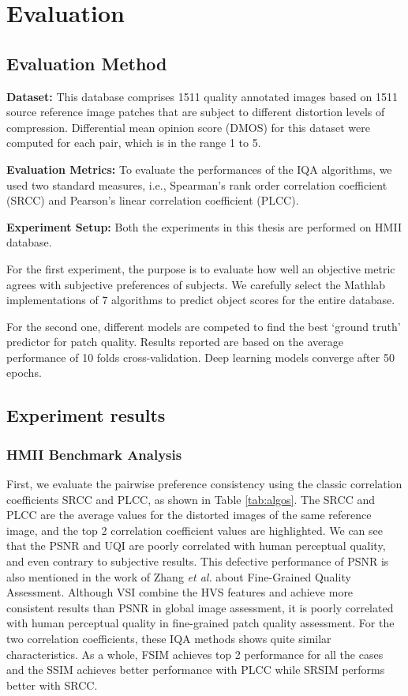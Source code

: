 \chapter{Evaluation}

\section{Evaluation Method} 

 
\textbf{Dataset:} 
This database comprises 1511 quality annotated images based on 1511 source reference image patches that are subject to different distortion levels of compression. 
Differential mean opinion score (DMOS) for this dataset were computed for each pair, which is in the range 1 to 5.

\textbf{Evaluation Metrics:}
To evaluate the performances of the IQA algorithms, we used two standard measures, i.e., Spearman's rank order correlation coefficient (SRCC) and Pearson's linear correlation coefficient (PLCC).

\textbf{Experiment Setup:}
Both the experiments in this thesis are performed on HMII database.

For the first experiment, the purpose is to evaluate how well an objective metric agrees with subjective preferences of subjects. We carefully select the Mathlab implementations of 7 algorithms to predict object scores for the entire database. 

For the second one, different models are competed to find the best \enquote*{ground truth} predictor for patch quality. 
Results reported are based on the average performance of 10 folds cross-validation. Deep learning models converge after 50 epochs.   


\section{Experiment results}

\subsection{HMII Benchmark Analysis}

First, we evaluate the pairwise preference consistency using the classic correlation coefficients SRCC and PLCC,
as shown in Table \ref{tab:algos}. 
The SRCC and PLCC are
the average values for the distorted images of the same
reference image, and the top 2 correlation coefficient values are highlighted. 
We can see that the PSNR and UQI are poorly correlated
with human perceptual quality, and even contrary to subjective
results. This defective performance of PSNR is also mentioned in the work of Zhang \emph{et al.}\cite{Zhang2019} about Fine-Grained Quality Assessment. Although VSI combine the HVS features and achieve more
consistent results than PSNR in global image assessment, it is poorly correlated with human perceptual quality in fine-grained patch quality assessment.
For the two correlation coefficients, these IQA methods
shows quite similar characteristics. As a whole, FSIM achieves top 2 performance for all the cases and the SSIM achieves better performance with PLCC while SRSIM performs better with SRCC. 

